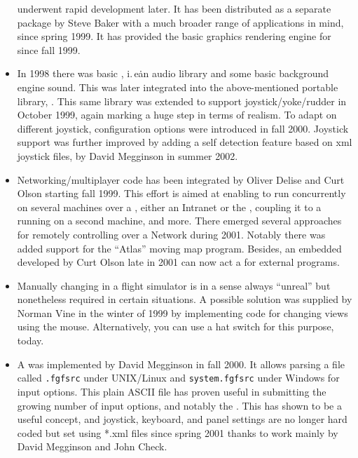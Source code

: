 \begin{itemize}
  \PLIB{} underwent rapid development later. It has been distributed as a separate package by
  Steve Baker with a much broader range of applications in mind, since spring 1999. It  has provided the basic graphics rendering engine for \FlightGear{} since fall 1999.
\item In 1998 there was basic , i.\,e\. an audio library
and some basic background engine sound. This was later integrated into the
above-mentioned portable library, \PLIB{}. This same library was extended to
support joystick/yoke/rudder in October 1999, again marking a huge step
in terms of realism. To adapt on different joystick, configuration options were
introduced in fall 2000. Joystick support was further improved by adding a self detection feature based on xml joystick files, by David Megginson in summer 2002.
\item Networking/multiplayer
 code has been integrated by Oliver Delise  and Curt
Olson starting fall 1999. This effort is aimed at enabling
\FlightGear{}  to run concurrently on several machines over a , either an Intranet or the , coupling it to a  running on a second
machine, and more. There emerged several approaches for remotely controlling \FlightGear{} over a Network during 2001. Notably there was added support for the ``Atlas'' moving map program. Besides, an embedded  developed by Curt Olson late in 2001 can now act a  for external programs.
\item Manually changing  in a flight simulator is in a sense always ``unreal'' but
nonetheless required in certain situations. A possible solution was supplied by Norman
Vine in the winter of 1999 by implementing code for changing views
using the mouse. Alternatively, you can use a hat switch for this purpose, today.
\item A  was implemented by David Megginson in
fall 2000. It allows parsing a file called \texttt{.fgfsrc} under
UNIX/Linux and \texttt{system.fgfsrc} under Windows for input
options. This plain ASCII file has proven useful in submitting the growing number of
input options, and notably the . This has shown to be a useful
concept, and joystick, keyboard, and panel settings are no longer hard coded but set
using *.xml files since spring 2001 thanks to work mainly by David Megginson and John
Check.
\end{itemize}


